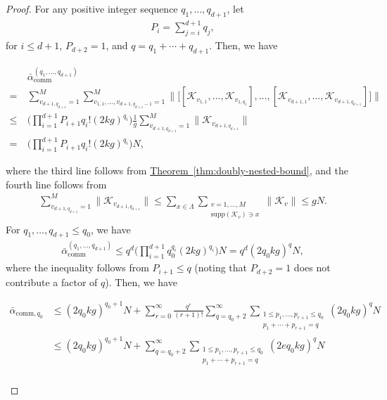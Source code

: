 \documentclass[aps,pra,reprint,groupedaddress,floatfix]{revtex4-2}
\newcommand{\thm}[1]{\hyperref[thm:#1]{Theorem~\ref*{thm:#1}}}
\renewcommand{\comm}{\mathrm{comm}}
\newcommand{\supp}{\mathrm{supp}}
\newcommand{\mc}{\mathcal}
\begin{document}
\begin{proof} 
    For any positive integer sequence $q_1, \ldots, q_{d+1}$, let 
    \begin{align*}
        P_{i} = \sum_{j=i}^{d+1} q_j,
    \end{align*}
    for $i\le d+1$, $P_{d+2} = 1$, and $q = q_1+\cdots+q_{d+1}$. Then, we have 
    \begin{widetext}
    \begin{align*}
    &\bar{\alpha}_{\comm}^{(q_1, \ldots, q_{d+1})}\\
    =~& \sum_{v_{d+1, q_{d+1}}=1}^{M} \sum_{v_{1,1}, \ldots, v_{d+1, q_{d+1}-1} = 1}^M \bigg\| \Big[ 
         [\mc K_{v_{1,1}}, \ldots, \mc K_{v_{1,q_1}}], \ldots, 
        [\mc K_{v_{d+1,1}}, \ldots, \mc K_{v_{d+1,q_{d+1}}}]
     \Big] \bigg\| \\
    \le~& \bigg(\prod_{i=1}^{d+1}P_{i+1}q_i!(2kg)^{q_i }\bigg)\frac{1}{g}\sum_{v_{d+1, q_{d+1}}=1}^{M} \|\mc K_{v_{d+1, q_{d+1}}}\|\\
    =~&  \bigg(\prod_{i=1}^{d+1}P_{i+1}q_i!(2kg)^{q_i }\bigg)N,
    \end{align*}
    \end{widetext}
where the third line follows from \thm{doubly-nested-bound}, and the fourth line follows from 
\begin{align*}
    \sum_{v_{d+1,q_{d+1}}=1}^{M}\|\mc K_{v_{d+1, q_{d+1}}}\|\le \sum_{x\in\Lambda}\sum_{\substack{v = 1, \ldots, M \\ \supp(\mc K_v)\ni x}} \|\mc K_{v}\|\le gN.
\end{align*}
For $q_1, \ldots, q_{d+1}\le q_0$, we have 
\begin{align*}
    \bar{\alpha}_{\comm}^{(q_1, \ldots, q_{d+1})}\le q^{d}\bigg(\prod_{i=1}^{d+1}q_0^{q_{i}}(2kg)^{q_i }\bigg)N = q^{d} (2q_0kg)^q N,
\end{align*}
where the inequality follows from $P_{i+1}\le q$ (noting that $P_{d+2} = 1$ does not contribute a factor of $q$). 
    Then, we have 
    \begin{widetext}
    \begin{align*}
    \bar{\alpha}_{\comm,q_0} &\le (2q_0 kg)^{q_0+1} N+ \sum_{r = 0}^{\infty}\frac{q^{r} }{(r+1)!} \sum_{q=q_0+2}^{\infty}\sum_{\substack{1\le p_1, \ldots, p_{r+1}\le q_0\\p_1+\cdots+p_{r+1} = q}}(2q_0 kg)^q N \\ 
    &\le  (2q_0 kg)^{q_0+1} N+  \sum_{q=q_0+2}^{\infty}\sum_{\substack{1\le p_1, \ldots, p_{r+1}\le q_0\\p_1+\cdots+p_{r+1} = q}} (2eq_0 kg)^q N\\

\end{align*}
\end{widetext}
\end{proof}
\end{document}
